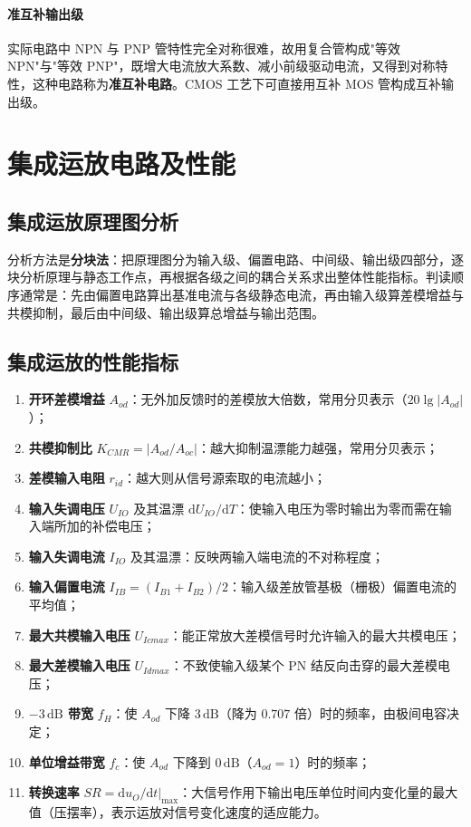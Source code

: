 \paragraph{准互补输出级}
实际电路中 NPN 与 PNP 管特性完全对称很难，故用复合管构成"等效 NPN"与"等效 PNP"，既增大电流放大系数、减小前级驱动电流，又得到对称特性，这种电路称为\textbf{准互补电路}。CMOS 工艺下可直接用互补 MOS 管构成互补输出级。

\section{集成运放电路及性能}

\subsection{集成运放原理图分析}

分析方法是\textbf{分块法}：把原理图分为输入级、偏置电路、中间级、输出级四部分，逐块分析原理与静态工作点，再根据各级之间的耦合关系求出整体性能指标。判读顺序通常是：先由偏置电路算出基准电流与各级静态电流，再由输入级算差模增益与共模抑制，最后由中间级、输出级算总增益与输出范围。

\subsection{集成运放的性能指标}

\begin{enumerate}
    \item \textbf{开环差模增益} $A_{od}$：无外加反馈时的差模放大倍数，常用分贝表示（$20\lg|A_{od}|$）；
    \item \textbf{共模抑制比} $K_{CMR}=|A_{od}/A_{oc}|$：越大抑制温漂能力越强，常用分贝表示；
    \item \textbf{差模输入电阻} $r_{id}$：越大则从信号源索取的电流越小；
    \item \textbf{输入失调电压} $U_{IO}$ 及其温漂 $\mathrm{d}U_{IO}/\mathrm{d}T$：使输入电压为零时输出为零而需在输入端所加的补偿电压；
    \item \textbf{输入失调电流} $I_{IO}$ 及其温漂：反映两输入端电流的不对称程度；
    \item \textbf{输入偏置电流} $I_{IB}=(I_{B1}+I_{B2})/2$：输入级差放管基极（栅极）偏置电流的平均值；
    \item \textbf{最大共模输入电压} $U_{Icmax}$：能正常放大差模信号时允许输入的最大共模电压；
    \item \textbf{最大差模输入电压} $U_{Idmax}$：不致使输入级某个 PN 结反向击穿的最大差模电压；
    \item \textbf{$-3\,\text{dB}$ 带宽} $f_H$：使 $A_{od}$ 下降 $3\,\text{dB}$（降为 $0.707$ 倍）时的频率，由极间电容决定；
    \item \textbf{单位增益带宽} $f_c$：使 $A_{od}$ 下降到 $0\,\text{dB}$（$A_{od}=1$）时的频率；
    \item \textbf{转换速率} $SR=\left.\mathrm{d}u_O/\mathrm{d}t\right|_{\max}$：大信号作用下输出电压单位时间内变化量的最大值（压摆率），表示运放对信号变化速度的适应能力。
\end{enumerate}

